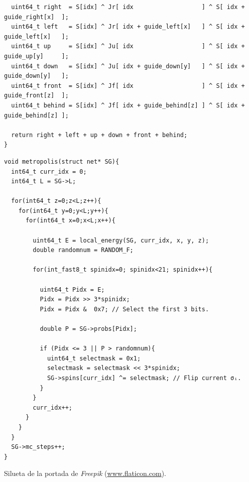 \documentclass[11pt]{report}
\begin{document}
\begin{appendices}
\begin{verbatim}
  uint64_t right  = S[idx] ^ Jr[ idx                   ] ^ S[ idx + guide_right[x]  ];
  uint64_t left   = S[idx] ^ Jr[ idx + guide_left[x]   ] ^ S[ idx + guide_left[x]   ];
  uint64_t up     = S[idx] ^ Ju[ idx                   ] ^ S[ idx + guide_up[y]     ];
  uint64_t down   = S[idx] ^ Ju[ idx + guide_down[y]   ] ^ S[ idx + guide_down[y]   ];
  uint64_t front  = S[idx] ^ Jf[ idx                   ] ^ S[ idx + guide_front[z]  ];
  uint64_t behind = S[idx] ^ Jf[ idx + guide_behind[z] ] ^ S[ idx + guide_behind[z] ];

  return right + left + up + down + front + behind;
}
\end{verbatim}

\newpage

\begin{verbatim}
void metropolis(struct net* SG){
  int64_t curr_idx = 0;
  int64_t L = SG->L;

  for(int64_t z=0;z<L;z++){
    for(int64_t y=0;y<L;y++){
      for(int64_t x=0;x<L;x++){

        uint64_t E = local_energy(SG, curr_idx, x, y, z);
        double randomnum = RANDOM_F;

        for(int_fast8_t spinidx=0; spinidx<21; spinidx++){

          uint64_t Pidx = E;
          Pidx = Pidx >> 3*spinidx;
          Pidx = Pidx &  0x7; // Select the first 3 bits.

          double P = SG->probs[Pidx];

          if (Pidx <= 3 || P > randomnum){
            uint64_t selectmask = 0x1;
            selectmask = selectmask << 3*spinidx;
            SG->spins[curr_idx] ^= selectmask; // Flip current σᵢ.
          }
        }
        curr_idx++;
      }
    }
  }
  SG->mc_steps++;
}
\end{verbatim}

\end{appendices}



\vspace{1cm}

Silueta de la portada de \emph{Freepik} (\url{www.flaticon.com}).
\end{document}
